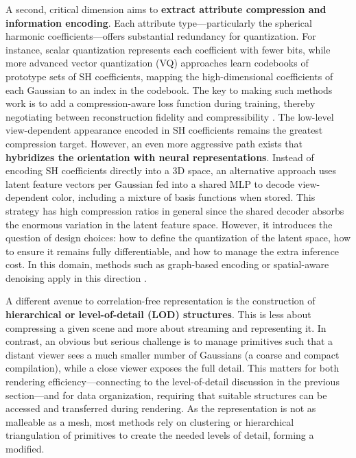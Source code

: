 \documentclass[11pt,a4paper]{article}
\begin{document}
A second, critical dimension aims to \textbf{extract attribute compression and information encoding}. Each attribute type---particularly the spherical harmonic coefficients---offers substantial redundancy for quantization. For instance, scalar quantization represents each coefficient with fewer bits, while more advanced vector quantization (VQ) approaches learn codebooks of prototype sets of SH coefficients, mapping the high-dimensional coefficients of each Gaussian to an index in the codebook. The key to making such methods work is to add a compression-aware loss function during training, thereby negotiating between reconstruction fidelity and compressibility \cite{arxiv:2412.10681v2}. The low-level view-dependent appearance encoded in SH coefficients remains the greatest compression target. However, an even more aggressive path exists that \textbf{hybridizes the orientation with neural representations}. Instead of encoding SH coefficients directly into a 3D space, an alternative approach uses latent feature vectors per Gaussian fed into a shared MLP to decode view-dependent color, including a mixture of basis functions when stored. This strategy has high compression ratios in general since the shared decoder absorbs the enormous variation in the latent feature space. However, it introduces the question of design choices: how to define the quantization of the latent space, how to ensure it remains fully differentiable, and how to manage the extra inference cost. In this domain, methods such as graph-based encoding or spatial-aware denoising apply in this direction \cite{arxiv:2604.01884v1,arxiv:2605.14880v1}.

A different avenue to correlation-free representation is the construction of \textbf{hierarchical or level-of-detail (LOD) structures}. This is less about compressing a given scene and more about streaming and representing it. In contrast, an obvious but serious challenge is to manage primitives such that a distant viewer sees a much smaller number of Gaussians (a coarse and compact compilation), while a close viewer exposes the full detail. This matters for both rendering efficiency---connecting to the level-of-detail discussion in the previous section---and for data organization, requiring that suitable structures can be accessed and transferred during rendering. As the representation is not as malleable as a mesh, most methods rely on clustering or hierarchical triangulation of primitives to create the needed levels of detail, forming a modified. 
\end{document}
